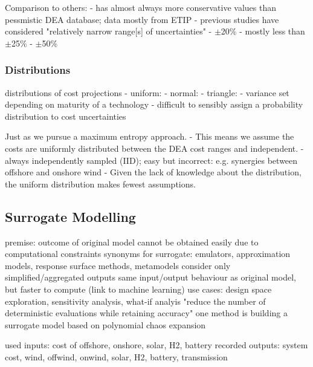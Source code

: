 Comparison to others:
- \cite{trondle_trade-offs_2020} has almost always more conservative values than pessmistic DEA database; data mostly from ETIP
- previous studies have considered "relatively narrow range[s] of uncertainties" \cite{Li2017}
- $\pm$20\% \cite{moret_characterization_2017}
- mostly less than $\pm$25\% \cite{pizarro-alonso_uncertainties_2019}
- $\pm$50\% \cite{shirizadeh_how_2019}

\subsubsection{Distributions}

distributions of cost projections
- uniform: \cite{moret_characterization_2017,moret_robust_2016,shirizadeh_how_2019,trondle_trade-offs_2020,pilpola_analyzing_2020,Li2017,Trutnevyte2013,lopion_cost_2019}
- normal: \cite{mavromatidis_uncertainty_2018}
- triangle: \cite{li_using_2020}
- variance set depending on maturity of a technology \cite{li_using_2020}
- difficult to sensibly assign a probability distribution to cost uncertainties \cite{moret_robust_2016}

Just as \cite{trondle_trade-offs_2020} we pursue a maximum entropy approach. 
- This means we assume the costs are uniformly distributed between the DEA cost ranges and independent.
- always independently sampled (IID); easy but incorrect: e.g. synergies between offshore and onshore wind
- Given the lack of knowledge about the distribution, the uniform distribution makes fewest assumptions.

\subsection{Surrogate Modelling}
\label{sec:surrogate}

premise: outcome of original model cannot be obtained easily due to computational constraints
synonyms for surrogate: emulators, approximation models, response surface methods, metamodels
consider only simplified/aggregated outputs
same input/output behaviour as original model, but faster to compute (link to machine learning)
use cases: design space exploration, sensitivity analysis, what-if analyis
"reduce the number of deterministic evaluations while retaining accuracy" \cite{palar_multi-fidelity_2016}
one method is building a surrogate model based on polynomial chaos expansion

used inputs: cost of offshore, onshore, solar, H2, battery
recorded outputs: system cost, wind, offwind, onwind, solar, H2, battery, transmission

